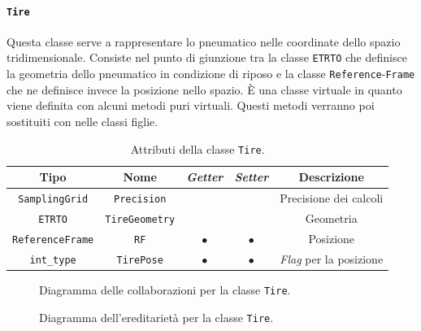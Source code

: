 \paragraph{\texttt{Tire}}
Questa classe serve a rappresentare lo pneumatico nelle coordinate dello spazio tridimensionale. Consiste nel punto di giunzione tra la classe \texttt{ETRTO} che definisce la geometria dello pneumatico in condizione di riposo e la classe \texttt{Reference}-\texttt{Frame} che ne definisce invece la posizione nello spazio. È una classe virtuale in quanto viene definita con alcuni metodi puri virtuali. Questi metodi verranno poi sostituiti con nelle classi figlie.
\begin{table}[h!]
	\centering
	\begin{tabular}{|c|c|c|c|c|}
		\hline 
		\textbf{Tipo} & \textbf{Nome} & \textit{\textbf{Getter}} & \textit{\textbf{Setter}} & \textbf{Descrizione} \\ \hline 
		\texttt{SamplingGrid} & \texttt{Precision} & & & Precisione dei calcoli \\ \hline 
		\texttt{ETRTO} & \texttt{TireGeometry} & & & Geometria \\ \hline 
		\texttt{ReferenceFrame} & \texttt{RF} & $\bullet$ & $\bullet$ & Posizione \\ \hline
		\texttt{int\_type} & \texttt{TirePose} & $\bullet$ & $\bullet$ & \textit{Flag} per la posizione \\ \hline
	\end{tabular}
	\caption{Attributi della classe \texttt{Tire}.}
	\label{}
\end{table}
%
\begin{figure}
	\centering
	\caption{Diagramma delle collaborazioni per la classe \texttt{Tire}.}
\end{figure}
%
\begin{figure}
	\centering
	\caption{Diagramma dell'ereditarietà per la classe \texttt{Tire}.}
\end{figure}
%
